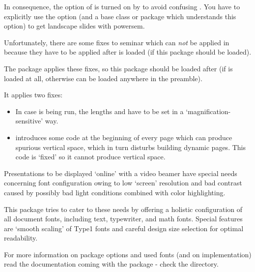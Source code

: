 \begin{slide}
In consequence, the  option of  is turned on by  to avoid confusing
. You have to explicitly use the  option (and a base class or package which understands
this option) to get landscape slides with powersem.

\newslide

Unfortunately, there are some fixes to seminar which can \emph{not} be applied in  because they have to
be applied after  is loaded (if this package should be loaded).

The package  applies these fixes, so this package should be loaded after  (if
 is loaded at all, otherwise  can be loaded anywhere in the preamble).

\newslide

It applies two fixes:
\begin{itemize}
\item In case  is being run, the lengths  and  have to
  be set in a `magnification-sensitive' way.

\item {} introduces some code at the beginning of every page which can produce spurious vertical space,
  which in turn disturbs building dynamic pages. This code is `fixed' so it cannot produce vertical space.
\end{itemize}

\newslide

\label{Sec:TPslifonts}
Presentations to be displayed `online' with a video beamer have special needs concerning font configuration owing to low
`screen' resolution and bad contrast caused by possibly bad light conditions combined with color highlighting.

This package tries to cater to these needs by offering a holistic configuration of all document fonts, including text,
typewriter, and math fonts. Special features are `smooth scaling' of Type1 fonts and careful design size selection for
optimal readability.

\newslide

For more information on package options and used fonts (and on implementation) read the documentation coming with the
package - check the  directory.


\end{slide}
